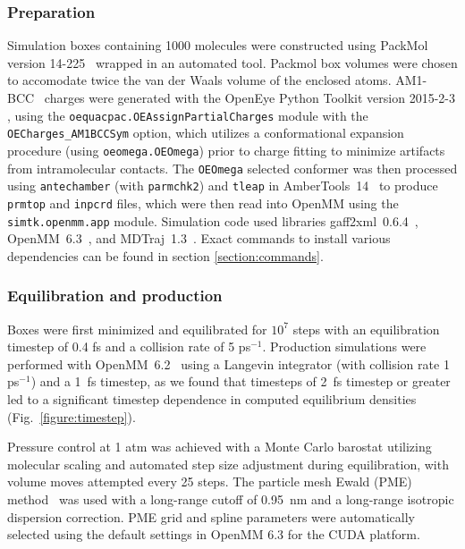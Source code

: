 \documentclass[aps,pre,twocolumn,nofootinbib,superscriptaddress,linenumbers]{revtex4-1}
\begin{document}
\subsubsection{Preparation}
\label{section:preparation}

Simulation boxes containing 1000 molecules were constructed using PackMol version 14-225~\cite{martinez2009packmol, packmolurl} wrapped in an automated tool.
Packmol box volumes were chosen to accomodate twice the van der Waals volume of the enclosed atoms.  
AM1-BCC~\cite{am1bcc1,am1bcc2, velez2014time} charges were generated with the OpenEye Python Toolkit version 2015-2-3 \cite{openeye}, using the {\tt oequacpac.OEAssignPartialCharges} module with the {\tt OECharges\_AM1BCCSym} option, which utilizes a conformational expansion procedure (using {\tt oeomega.OEOmega}) prior to charge fitting to minimize artifacts from intramolecular contacts.  
The {\tt OEOmega} selected conformer was then processed using {\tt antechamber} (with {\tt parmchk2}) and {\tt tleap} in AmberTools~14~\cite{amber14} to produce {\tt prmtop} and {\tt inpcrd} files, which were then read into OpenMM using the {\tt simtk.openmm.app} module.
Simulation code used libraries gaff2xml~0.6.4~\cite{gaff2xml}, OpenMM~6.3~\cite{eastman2012openmm}, and MDTraj~1.3~\cite{mcgibbon2014mdtraj}.  
Exact commands to install various dependencies can be found in section \ref{section:commands}.

\subsubsection{Equilibration and production}
\label{section:production}

Boxes were first minimized and equilibrated for $10^7$ steps with an equilibration timestep of 0.4 fs and a collision rate of 5 ps$^{-1}$.  
Production simulations were performed with OpenMM~6.2~\cite{eastman2012openmm} using a Langevin integrator (with collision rate 1 ps$^{-1}$) and a 1~fs timestep, as we found that timesteps of 2~fs timestep or greater led to a significant timestep dependence in computed equilibrium densities (Fig.~\ref{figure:timestep}).  

Pressure control at 1 atm was achieved with a Monte Carlo barostat utilizing molecular scaling and automated step size adjustment during equilibration, with volume moves attempted every 25 steps.  
The particle mesh Ewald (PME) method~\cite{Darden1993} was used with a long-range cutoff of 0.95~nm and a long-range isotropic dispersion correction. 
PME grid and spline parameters were automatically selected using the default settings in OpenMM 6.3 for the CUDA platform.
\end{document}
